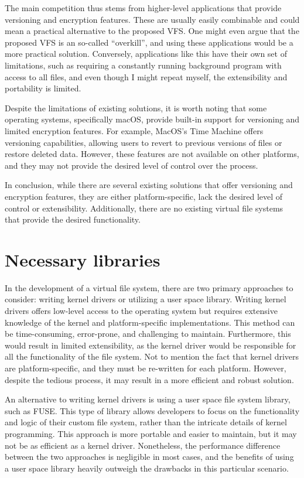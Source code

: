 The main competition thus stems from higher-level applications that provide versioning and encryption features.
These are usually easily combinable and could mean a practical alternative to the proposed VFS\@.
One might even argue that the proposed VFS is an so-called ``overkill'', and using these applications would be a more practical solution.
Conversely, applications like this have their own set of limitations, such as requiring a constantly running background program with access to all files, and even though I might repeat myself, the extensibility and portability is limited.

Despite the limitations of existing solutions, it is worth noting that some operating systems, specifically macOS, provide built-in support for versioning and limited encryption features.
For example, MacOS's Time Machine offers versioning capabilities, allowing users to revert to previous versions of files or restore deleted data.
However, these features are not available on other platforms, and they may not provide the desired level of control over the process.

In conclusion, while there are several existing solutions that offer versioning and encryption features, they are either platform-specific, lack the desired level of control or extensibility.
Additionally, there are no existing virtual file systems that provide the desired functionality.


\section{Necessary libraries}\label{sec:libs}


In the development of a virtual file system, there are two primary approaches to consider: writing kernel drivers or utilizing a user space library.
Writing kernel drivers offers low-level access to the operating system but requires extensive knowledge of the kernel and platform-specific implementations.
This method can be time-consuming, error-prone, and challenging to maintain.
Furthermore, this would result in limited extensibility, as the kernel driver would be responsible for all the functionality of the file system.
Not to mention the fact that kernel drivers are platform-specific, and they must be re-written for each platform.
However, despite the tedious process, it may result in a more efficient and robust solution.

An alternative to writing kernel drivers is using a user space file system library, such as FUSE\@.
This type of library allows developers to focus on the functionality and logic of their custom file system, rather than the intricate details of kernel programming.
This approach is more portable and easier to maintain, but it may not be as efficient as a kernel driver.
Nonetheless, the performance difference between the two approaches is negligible in most cases, and the benefits of using a user space library heavily outweigh the drawbacks in this particular scenario.

